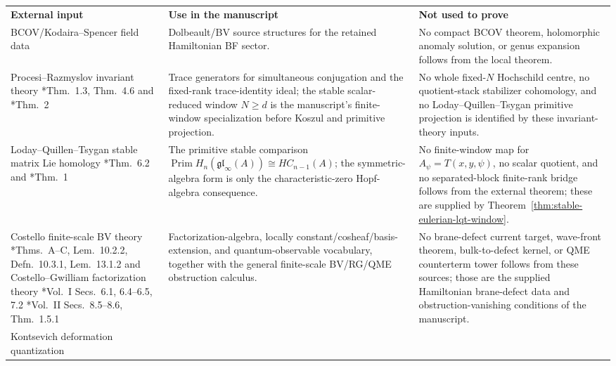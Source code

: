\begin{center}
\footnotesize
\renewcommand{\arraystretch}{1.15}
\begin{tabular}{@{}>{\raggedright\arraybackslash}p{}
  >{\raggedright\arraybackslash}p{}
  >{\raggedright\arraybackslash}p{}@{}}
\textbf{External input} & \textbf{Use in the manuscript} &
\textbf{Not used to prove} \\
BCOV/Kodaira--Spencer field data \cite{bcov} &
Dolbeault/BV source structures for the retained Hamiltonian BF sector. &
No compact BCOV theorem, holomorphic anomaly solution, or genus
expansion follows from the local theorem. \\
Procesi--Razmyslov invariant theory
\cite{procesi}*{Thm.~1.3, Thm.~4.6} and \cite{razmyslov}*{Thm.~2} &
Trace generators for simultaneous conjugation and the fixed-rank
trace-identity ideal; the stable scalar-reduced window \(N\ge d\) is the
manuscript's finite-window specialization before Koszul and primitive
projection. &
No whole fixed-\(N\) Hochschild centre, no quotient-stack stabilizer
cohomology, and no Loday--Quillen--Tsygan primitive projection is
identified by these invariant-theory inputs. \\
Loday--Quillen--Tsygan stable matrix Lie homology
\cite{loday-quillen}*{Thm.~6.2} and \cite{tsygan}*{Thm.~1} &
The primitive stable comparison
\(\operatorname{Prim}H_n(\mathfrak{gl}_\infty(A))\cong HC_{n-1}(A)\);
the symmetric-algebra form is only the characteristic-zero
Hopf-algebra consequence. &
No finite-window map for \(A_\psi=T(x,y,\psi)\), no scalar quotient, and
no separated-block finite-rank bridge follows from the external theorem;
these are supplied by Theorem~\ref{thm:stable-eulerian-lqt-window}. \\
Costello finite-scale BV theory
\cite{costello-renormalization}*{Thms.~A--C, Lem.~10.2.2,
Defn.~10.3.1, Lem.~13.1.2} and Costello--Gwilliam factorization theory
\cite{costello-gwilliam}*{Vol.~I Secs.~6.1, 6.4--6.5, 7.2}
\cite{costello-gwilliam-vol2}*{Vol.~II Secs.~8.5--8.6, Thm.~1.5.1} &
Factorization-algebra, locally constant/cosheaf/basis-extension, and
quantum-observable vocabulary, together with the general finite-scale
BV/RG/QME obstruction calculus. &
No brane-defect current target, wave-front theorem, bulk-to-defect
kernel, or QME counterterm tower follows from these sources; those are
the supplied Hamiltonian brane-defect data and obstruction-vanishing
conditions of the manuscript. \\
Kontsevich deformation quantization \cite{kontsevich-dq} &

\end{tabular}
\end{center}
